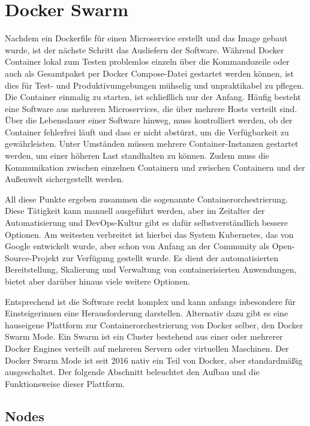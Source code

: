 \chapter{Docker Swarm}\label{ch:dockerswarm}

Nachdem ein Dockerfile für einen Microservice erstellt und das Image gebaut wurde, ist der nächste Schritt das Ausliefern der Software. 
Während Docker Container lokal zum Testen problemlos einzeln über die Kommandozeile oder auch als Gesamtpaket per Docker Compose-Datei gestartet werden können, ist dies für Test- und Produktivumgebungen mühselig und unpraktikabel zu pflegen. 
Die Container einmalig zu starten, ist schließlich nur der Anfang.
H\"aufig besteht eine Software aus mehreren Microservices, die \"uber mehrere Hosts verteilt sind. 
Über die Lebensdauer einer Software hinweg, muss kontrolliert werden, ob der Container fehlerfrei läuft und dass er nicht abstürzt, um die Verfügbarkeit zu gewährleisten.
Unter Umständen müssen mehrere Container-Instanzen gestartet werden, um einer höheren Last standhalten zu können. 
Zudem muss die Kommunikation zwischen einzelnen Containern und zwischen Containern und der Außenwelt sichergestellt werden. 

All diese Punkte ergeben zusammen die sogenannte Containerorchestrierung. 
Diese Tätigkeit kann manuell ausgeführt werden, aber im Zeitalter der Automatisierung und DevOps-Kultur gibt es dafür selbstverständlich bessere Optionen. 
Am weitesten verbreitet ist hierbei das System Kubernetes, das von Google entwickelt wurde, aber schon von Anfang an der Community als Open-Source-Projekt zur Verfügung gestellt wurde. 
Es dient der automatisierten Bereitstellung, Skalierung und Verwaltung von containerisierten Anwendungen, bietet aber darüber hinaus viele weitere Optionen.

Entsprechend ist die Software recht komplex und kann anfangs inbesondere f\"ur Einsteigerinnen eine Herausforderung darstellen. 
Alternativ dazu gibt es eine hauseigene Plattform zur Containerorchestrierung von Docker selber, den Docker Swarm Mode. 
Ein Swarm ist ein Cluster bestehend aus einer oder mehrerer Docker Engines verteilt auf mehreren Servern oder virtuellen Maschinen.\cite{Docker_Engine_Swarm}
Der Docker Swarm Mode ist seit 2016 nativ ein Teil von Docker, aber standardm\"a{\ss}ig ausgeschaltet.
Der folgende Abschnitt beleuchtet den Aufbau und die Funktionsweise dieser Plattform.  

\section{Nodes}

